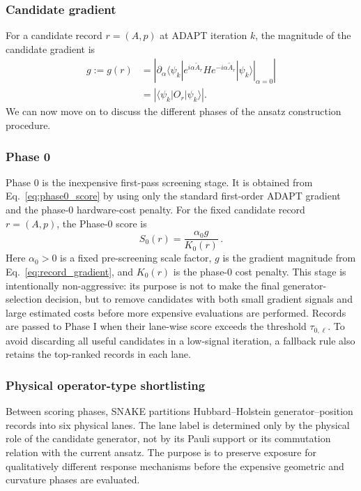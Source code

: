 \documentclass[
  reprint,
  amsmath,
  amssymb,
  aps,
  pra,
  nofootinbib,
  superscriptaddress,
  floatfix
]{revtex4-2}
\begin{document}
\subsubsection{Candidate gradient}
%
\noindent
For a candidate record \(r=(A,p)\) at ADAPT iteration \(k\), the magnitude of the candidate gradient is
\begin{equation}
\begin{aligned}
g:=g(r)
&=
\left|
\left.
\partial_\alpha
\langle\psi_k|
e^{i\alpha\widetilde A_r}
H
e^{-i\alpha\widetilde A_r}
|\psi_k\rangle
\right|_{\alpha=0}
\right|\\
&=
\left|\langle\psi_k|O_r|\psi_k\rangle\right| .
\end{aligned}
\label{eq:record_gradient}
\end{equation}
%
We can now move on to discuss the different phases of the ansatz construction procedure.

\subsubsection{Phase 0}
%
\noindent
Phase 0 is the inexpensive first-pass screening stage. It is obtained from Eq.~\eqref{eq:phase0_score} by using only the standard first-order ADAPT gradient and the phase-0 hardware-cost penalty. For the fixed candidate record \(r=(A,p)\), the Phase-0 score is
%
\begin{equation}
S_{0}(r)=\frac{\alpha_0 g}{K_0(r)}\,.
\label{eq:phase0_score}
\end{equation}
%
Here \(\alpha_0>0\) is a fixed pre-screening scale factor, \(g\) is the gradient magnitude from Eq.~\eqref{eq:record_gradient}, and \(K_0(r)\) is the phase-0 cost penalty. This stage is intentionally non-aggressive: its purpose is not to make the final generator-selection decision, but to remove candidates with both small gradient signals and large estimated costs before more expensive evaluations are performed. Records are passed to Phase I when their lane-wise score exceeds the threshold \(\tau_{0,\ell}\). To avoid discarding all useful candidates in a low-signal iteration, a fallback rule also retains the top-ranked records in each lane.

\subsubsection{Physical operator-type shortlisting}
\label{subsec:hh_physical_operator_lanes}
%
Between scoring phases, \textsc{SNAKE} partitions Hubbard--Holstein
generator--position records into six physical lanes. The lane label is determined only by the
physical role of the candidate generator, not by its Pauli support or its
commutation relation with the current ansatz. The purpose is to preserve
exposure for qualitatively different response mechanisms before the expensive
geometric and curvature phases are evaluated.
\end{document}
